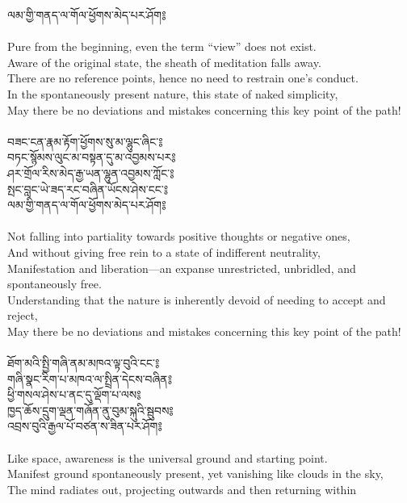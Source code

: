 ལམ་གྱི་གནད་ལ་གོལ་ཕྱོགས་མེད་པར་ཤོག༔\\
\\
\ru Pure from the beginning, even the term “view” does not exist.\\
Aware of the original state, the sheath of meditation falls away.\\
There are no reference points, hence no need to restrain one’s conduct.\\
In the spontaneously present nature, this state of naked simplicity,\\
May there be no deviations and mistakes concerning this key point of the path!\\
\\
\newpage
\ti བཟང་ངན་རྣམ་རྟོག་ཕྱོགས་སུ་མ་ལྷུང་ཞིང༌༔\\
བཏང་སྙོམས་ལུང་མ་བསྟན་དུ་མ་འབྱམས་པར༔\\
ཤར་གྲོལ་རིས་མེད་རྒྱ་ཡན་ལྷུན་འབྱམས་ཀློང༌༔\\
སྤང་བླང་ཡེ་ཟད་རང་བཞིན་ཡོངས་ཤེས་ངང༌༔\\
ལམ་གྱི་གནད་ལ་གོལ་ཕྱོགས་མེད་པར་ཤོག༔\\
\\
\ru Not falling into partiality towards positive thoughts or negative ones,\\
And without giving free rein to a state of indifferent neutrality,\\
Manifestation and liberation—an expanse unrestricted, unbridled, and spontaneously free.\\
Understanding that the nature is inherently devoid of needing to accept and reject,\\
May there be no deviations and mistakes concerning this key point of the path!\\
\\
\ti ཐོག་མའི་སྤྱི་གཞི་ནམ་མཁའ་ལྟ་བུའི་ངང༌༔\\
གཞི་སྣང་རིག་པ་མཁའ་ལ་སྤྲིན་དེངས་བཞིན༔\\
ཕྱི་གསལ་ཤེས་པ་ནང་དུ་ལྡོག་པ་ལས༔\\
ཁྱད་ཆོས་དྲུག་ལྡན་གཞོན་ནུ་བུམ་སྐུའི་སྦུབས༔\\
འབྲས་བུའི་རྒྱལ་པོ་བཙན་ས་ཟིན་པར་ཤོག༔\\
\\
\ru Like space, awareness is the universal ground and starting point.\\
Manifest ground spontaneously present, yet vanishing like clouds in the sky,\\
The mind radiates out, projecting outwards and then returning within\\
